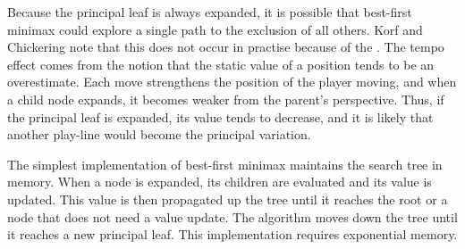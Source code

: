 Because the principal leaf is always expanded, it is possible that best-first minimax could explore a single path to the exclusion of all others.  Korf and Chickering note that this does not occur in practise because of the . The tempo effect comes from the notion that the static value of a position tends to be an overestimate.  Each move strengthens  the position of the player moving, and when a child node expands, it becomes weaker from the parent's perspective.  Thus, if the principal leaf is expanded, its value tends to decrease, and it is likely that another play-line would become the principal variation.

The simplest implementation of best-first minimax maintains the search tree in memory.  When a node is expanded, its children are evaluated and its value is updated.  This value is then propagated up the tree  until it reaches the root or a node  that does not need a value update.  The algorithm moves down the tree until it reaches a new principal leaf.  This implementation requires exponential memory.  

